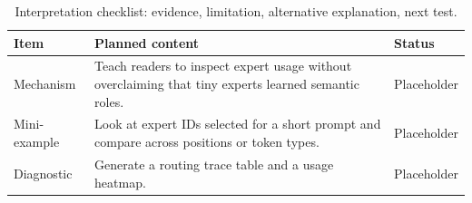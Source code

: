 \begin{table}[H]
\centering
\caption{Interpretation checklist: evidence, limitation, alternative explanation, next test.}
\label{tab:ch11-interpreting-expert-behavior-carefully}
\begin{tabularx}{\textwidth}{p{}X p{}}
\toprule
Item & Planned content & Status \\
\midrule
Mechanism & Teach readers to inspect expert usage without overclaiming that tiny experts learned semantic roles. & Placeholder \\
Mini-example & Look at expert IDs selected for a short prompt and compare across positions or token types. & Placeholder \\
Diagnostic & Generate a routing trace table and a usage heatmap. & Placeholder \\
\bottomrule
\end{tabularx}
\end{table}
